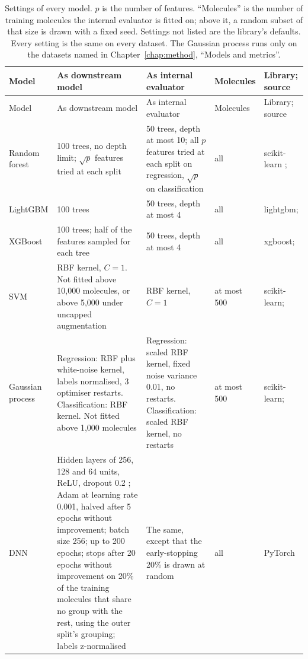 {\small
\begin{longtable}{@{}p{1.9cm}p{4.6cm}p{3.6cm}p{1.6cm}p{2.3cm}@{}}
\caption{Settings of every model. $p$ is the number of features. ``Molecules'' is the number of training molecules the internal evaluator is fitted on; above it, a random subset of that size is drawn with a fixed seed. Settings not listed are the library's defaults. Every setting is the same on every dataset. The Gaussian process runs only on the datasets named in Chapter~\ref{chap:method}, ``Models and metrics''.}
\label{tab:add:model_settings}\\
\toprule
Model & As downstream model & As internal evaluator & Molecules & Library; source \\
\midrule
\endfirsthead
\toprule
Model & As downstream model & As internal evaluator & Molecules & Library; source \\
\midrule
\endhead
Random forest & 100 trees, no depth limit; $\sqrt{p}$ features tried at each split & 50 trees, depth at most 10; all $p$ features tried at each split on regression, $\sqrt{p}$ on classification & all & scikit-learn \citep{scikit-learn}; \citet{Breiman2001} \\
\addlinespace
LightGBM & 100 trees & 50 trees, depth at most 4 & all & lightgbm; \citet{ke2017lightgbm} \\
\addlinespace
XGBoost & 100 trees; half of the features sampled for each tree & 50 trees, depth at most 4 & all & xgboost; \citet{Chen2016} \\
\addlinespace
SVM & RBF kernel, $C = 1$. Not fitted above 10{,}000 molecules, or above 5{,}000 under uncapped augmentation & RBF kernel, $C = 1$ & at most 500 & scikit-learn; \citet{Vapnik1995} \\
\addlinespace
Gaussian process & Regression: RBF plus white-noise kernel, labels normalised, 3 optimiser restarts. Classification: RBF kernel. Not fitted above 1{,}000 molecules & Regression: scaled RBF kernel, fixed noise variance 0.01, no restarts. Classification: scaled RBF kernel, no restarts & at most 500 & scikit-learn; \citet{Rasmussen2006} \\
\addlinespace
DNN & Hidden layers of 256, 128 and 64 units, ReLU, dropout 0.2 \citep{Srivastava2014}; Adam \citep{Kingma2015} at learning rate 0.001, halved after 5 epochs without improvement; batch size 256; up to 200 epochs; stops after 20 epochs without improvement on 20\% of the training molecules that share no group with the rest, using the outer split's grouping; labels z-normalised & The same, except that the early-stopping 20\% is drawn at random & all & PyTorch \citep{Paszke2019} \\
\bottomrule
\end{longtable}
}

